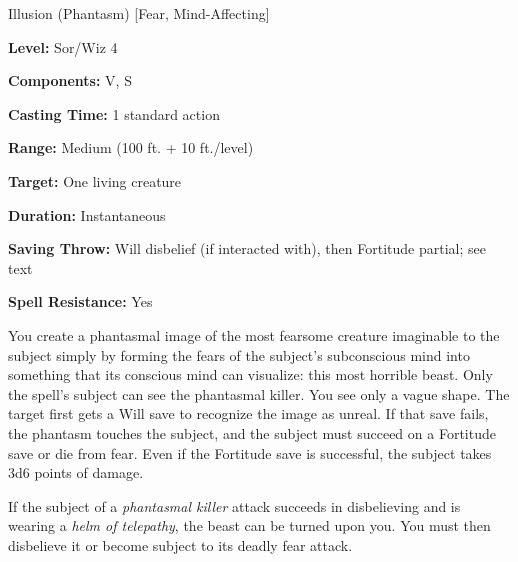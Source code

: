 
Illusion (Phantasm) [Fear, Mind-Affecting]

\textbf{Level:} Sor/Wiz 4

\textbf{Components:} V, S

\textbf{Casting Time:} 1 standard action

\textbf{Range:} Medium (100 ft. + 10 ft./level)

\textbf{Target:} One living creature

\textbf{Duration:} Instantaneous

\textbf{Saving Throw:} Will disbelief (if interacted with), then Fortitude partial; 
see text

\textbf{Spell Resistance:} Yes

You create a phantasmal image of the most fearsome creature imaginable to the subject 
simply by forming the fears of the subject's subconscious mind into something that 
its conscious mind can visualize: this most horrible beast. Only the spell's subject 
can see the phantasmal killer. You see only a vague shape. The target first gets 
a Will save to recognize the image as unreal. If that save fails, the phantasm 
touches the subject, and the subject must succeed on a Fortitude save or die from 
fear. Even if the Fortitude save is successful, the subject takes 3d6 points of 
damage.

If the subject of a \textit{phantasmal killer} attack succeeds in disbelieving 
and is wearing a \textit{helm of telepathy}, the beast can be turned upon you. 
You must then disbelieve it or become subject to its deadly fear attack.

